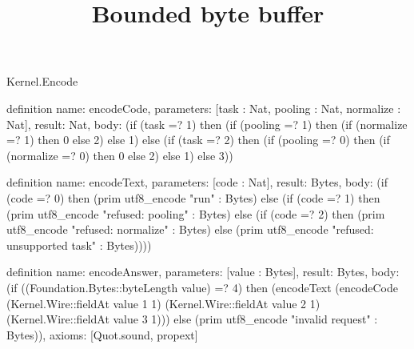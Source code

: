 \begin{lexlean}{Kernel.Encode}
\title{Bounded byte buffer}
\begin{semanticmodule}
definition{
  name: encodeCode,
  parameters: [task : Nat, pooling : Nat, normalize : Nat],
  result: Nat,
  body: (if (task =? 1) then (if (pooling =? 1) then (if (normalize =? 1) then 0 else 2) else 1) else (if (task =? 2) then (if (pooling =? 0) then (if (normalize =? 0) then 0 else 2) else 1) else 3))
}

definition{
  name: encodeText,
  parameters: [code : Nat],
  result: Bytes,
  body: (if (code =? 0) then (prim utf8_encode "run" : Bytes) else (if (code =? 1) then (prim utf8_encode "refused: pooling" : Bytes) else (if (code =? 2) then (prim utf8_encode "refused: normalize" : Bytes) else (prim utf8_encode "refused: unsupported task" : Bytes))))
}

definition{
  name: encodeAnswer,
  parameters: [value : Bytes],
  result: Bytes,
  body: (if ((Foundation.Bytes::byteLength value) =? 4) then (encodeText (encodeCode (Kernel.Wire::fieldAt value 1 1) (Kernel.Wire::fieldAt value 2 1) (Kernel.Wire::fieldAt value 3 1))) else (prim utf8_encode "invalid request" : Bytes)),
  axioms: [Quot.sound, propext]
}
\end{semanticmodule}
\end{lexlean}
